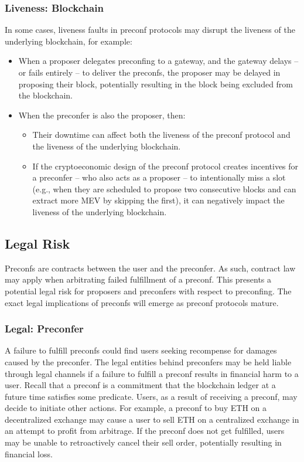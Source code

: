\documentclass[a4paper]{article}
\theoremstyle{boldstyle}
\begin{document}
    \subsubsection{Liveness: Blockchain} 
\label{risk_liveness:protocol}
In some cases, liveness faults in preconf protocols may disrupt the liveness of the underlying blockchain, for example: 
\begin{itemize}
    \item When a proposer delegates preconfing to a gateway, and the gateway delays -- or fails entirely -- to deliver the preconfs, the proposer may be delayed in proposing their block, potentially resulting in the block being excluded from the blockchain.
    \item When the preconfer is also the proposer, then:
    \begin{itemize}
        \item Their downtime can affect both the liveness of the preconf protocol and the liveness of the underlying blockchain.
        \item If the cryptoeconomic design of the preconf protocol creates incentives for a preconfer -- who also acts as a proposer -- to intentionally miss a slot (e.g., when they are scheduled to propose two consecutive blocks and can extract more MEV by skipping the first), it can negatively impact the liveness of the underlying blockchain.
    \end{itemize}
\end{itemize}

    
\subsection{Legal Risk}
Preconfs are contracts between the user and the preconfer. 
As such, contract law \cite{W:ContractLaw} may apply when arbitrating failed fulfillment of a preconf.
This presents a potential legal risk for proposers and preconfers with respect to preconfing. The exact legal implications of preconfs will emerge as preconf protocols mature.

\subsubsection{Legal: Preconfer} 
    A failure to fulfill preconfs could find users seeking recompense for damages caused by the preconfer.
    The legal entities behind preconfers may be held liable through legal channels if a failure to fulfill a preconf results in financial harm to a user. Recall that a preconf is a commitment that the blockchain ledger at a future time satisfies some predicate. 
    Users, as a result of receiving a preconf, may decide to initiate other actions.
    For example, a preconf to buy ETH on a decentralized exchange may cause a user to sell ETH on a centralized exchange in an attempt to profit from arbitrage. If the preconf does not get fulfilled, users may be unable to retroactively cancel their sell order, potentially resulting in financial loss.  
    
\end{document}
